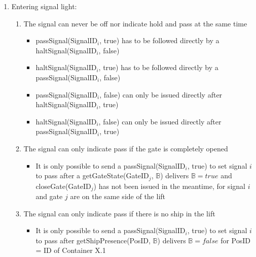 \begin{enumerate}
	
	\item Entering signal light:
		\begin{enumerate}
			\item The signal can never be off nor indicate hold and pass at the same time
				\begin{itemize}
					\item passSignal(SignalID$_i$, true) has to be followed directly by a haltSignal(SignalID$_i$, false)
					\item haltSignal(SignalID$_i$, true) has to be followed directly by a passSignal(SignalID$_i$, false)
					\item passSignal(SignalID$_i$, false) can only be issued directly after haltSignal(SignalID$_i$, true)
					\item haltSignal(SignalID$_i$, false) can only be issued directly after passSignal(SignalID$_i$, true)
				\end{itemize}
			\item The signal can only indicate pass if the gate is completely opened
				\begin{itemize}
					\item It is only possible to send a passSignal(SignalID$_i$, true) to set signal $i$ to pass after a getGateState(GateID$_j$, $ \mathbb{B} $) delivers $\mathbb{B} = true$ and closeGate(GateID$_j$) has not been issued in the meantime, for signal $i$ and gate $j$ are on the same side of the lift
				\end{itemize}
			\item The signal can only indicate pass if there is no ship in the lift
				\begin{itemize}
					\item It is only possible to send a passSignal(SignalID$_i$, true) to set signal $i$ to pass after getShipPresence(PosID, $\mathbb{B}$) delivers $\mathbb{B} = false$ for PosID = ID of Container X.1
				\end{itemize}
			

\end{enumerate}
\end{enumerate}
